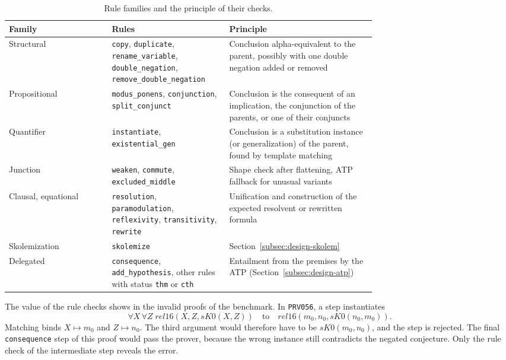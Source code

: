 \begin{table}[!htb]
\centering
\small
\caption{Rule families and the principle of their checks.}
\label{tab:rule-families}
\begin{tabular}{@{}l P{0.32\linewidth} P{0.40\linewidth}@{}}
\toprule
Family & Rules & Principle \\
\midrule
Structural & \texttt{copy}, \texttt{duplicate}, \texttt{rename\_variable}, \texttt{double\_negation}, \texttt{remove\_double\_negation} & Conclusion alpha-equivalent to the parent, possibly with one double negation added or removed \\
\addlinespace[4pt]
Propositional & \texttt{modus\_ponens}, \texttt{conjunction}, \texttt{split\_conjunct} & Conclusion is the consequent of an implication, the conjunction of the parents, or one of their conjuncts \\
\addlinespace[4pt]
Quantifier & \texttt{instantiate}, \texttt{existential\_gen} & Conclusion is a substitution instance (or generalization) of the parent, found by template matching \\
\addlinespace[4pt]
Junction & \texttt{weaken}, \texttt{commute}, \texttt{excluded\_middle} & Shape check after flattening, ATP fallback for unusual variants \\
\addlinespace[4pt]
Clausal, equational & \texttt{resolution}, \texttt{paramodulation}, \texttt{reflexivity}, \texttt{transitivity}, \texttt{rewrite} & Unification and construction of the expected resolvent or rewritten formula \\
\addlinespace[4pt]
Skolemization & \texttt{skolemize} & Section~\ref{subsec:design-skolem} \\
\addlinespace[4pt]
Delegated & \texttt{consequence}, \texttt{add\_hypothesis}, other rules with status \texttt{thm} or \texttt{cth} & Entailment from the premises by the ATP (Section~\ref{subsec:design-atp}) \\
\bottomrule
\end{tabular}
\end{table}

The value of the rule checks shows in the invalid proofs of the benchmark.
In \texttt{PRV056}, a step instantiates
\[
  \forall X\,\forall Z\;\mathit{rel16}(X,Z,\mathit{sK0}(X,Z))
  \quad\text{to}\quad
  \mathit{rel16}(m_0,n_0,\mathit{sK0}(n_0,m_0)).
\]
Matching binds $X \mapsto m_0$ and $Z \mapsto n_0$. The third argument would therefore have to be $\mathit{sK0}(m_0,n_0)$, and the step is rejected.
The final \texttt{consequence} step of this proof would pass the prover, because the wrong instance still contradicts the negated conjecture.
Only the rule check of the intermediate step reveals the error.

